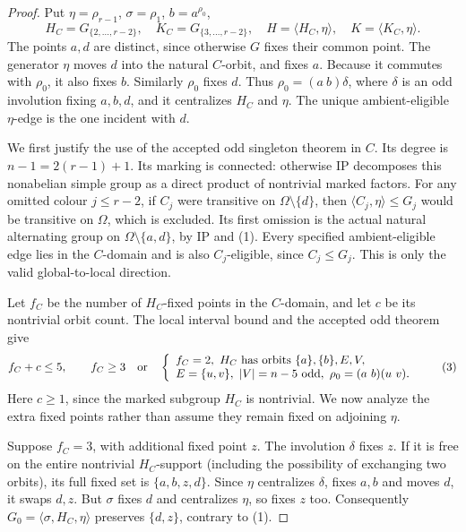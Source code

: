 \documentclass[11pt,a4paper]{article}
\newcommand{\gen}[1]{\langle#1\rangle}
\begin{document}
\begin{proof}
Put $\eta=\rho_{r-1}$, $\sigma=\rho_1$, $b=a^{\rho_0}$,
\[
 H_C=G_{\{2,\ldots,r-2\}},\quad
 K_C=G_{\{3,\ldots,r-2\}},\quad
 H=\gen{H_C,\eta},\quad K=\gen{K_C,\eta}.
\]
The points $a,d$ are distinct, since otherwise $G$ fixes their common
point. The generator $\eta$ moves $d$ into the natural $C$-orbit,
and fixes $a$. Because it commutes with $\rho_0$, it also fixes $b$.
Similarly $\rho_0$ fixes $d$. Thus $\rho_0=(a\ b)\delta$, where
$\delta$ is an odd involution fixing $a,b,d$, and it centralizes
$H_C$ and $\eta$. The unique ambient-eligible $\eta$-edge is the
one incident with $d$.

We first justify the use of the accepted odd singleton theorem in
$C$. Its degree is $n-1=2(r-1)+1$. Its marking is connected:
otherwise IP decomposes this nonabelian simple group as a direct
product of nontrivial marked factors. For any omitted colour
$j\le r-2$, if $C_j$ were transitive on $\Omega\setminus\{d\}$,
then $\gen{C_j,\eta}\le G_j$ would be transitive on $\Omega$, which
is excluded. Its first omission is the actual natural alternating
group on $\Omega\setminus\{a,d\}$, by IP and (1).
Every specified ambient-eligible edge lies in the $C$-domain and
is also $C_j$-eligible, since $C_j\le G_j$. This is only the valid
global-to-local direction.

Let $f_C$ be the number of $H_C$-fixed points in the $C$-domain,
and let $c$ be its nontrivial orbit count. The local interval bound
and the accepted odd theorem give
\[
 f_C+c\le5,\qquad f_C\ge3\quad\hbox{or}\quad
 \left\{\begin{array}{l}
 f_C=2,\ H_C\hbox{ has orbits }\{a\},\{b\},E,V,\\
 E=\{u,v\},\ |V|=n-5\hbox{ odd},\
 \rho_0=(a\ b)(u\ v).
 \end{array}\right.                                   \tag{3}
\]
Here $c\ge1$, since the marked subgroup $H_C$ is nontrivial.
We now analyze the extra fixed points rather than assume they
remain fixed on adjoining $\eta$.

Suppose $f_C=3$, with additional fixed point $z$.
The involution $\delta$ fixes $z$. If it is free on the entire
nontrivial $H_C$-support (including the possibility of exchanging
two orbits), its full fixed set is $\{a,b,z,d\}$. Since $\eta$
centralizes $\delta$, fixes $a,b$ and moves $d$, it swaps $d,z$.
But $\sigma$ fixes $d$ and centralizes $\eta$, so fixes $z$ too.
Consequently $G_0=\gen{\sigma,H_C,\eta}$ preserves $\{d,z\}$,
contrary to (1).


\end{proof}
\end{document}
